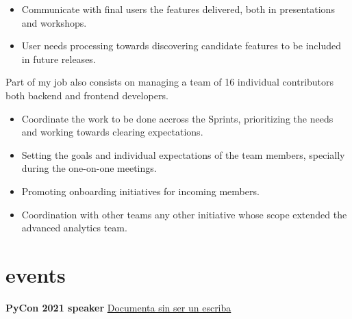 \documentclass[]{friggeri-cv}
\begin{document}
\begin{entrylist}
{\begin{itemize}
  \item Communicate with final users the features delivered, both in presentations and workshops.
  \item User needs processing towards discovering candidate features to be included in future releases.
\end{itemize}
Part of my job also consists on managing a team of 16 individual contributors both backend and frontend developers.
\begin{itemize}
  \item Coordinate the work to be done accross the Sprints, prioritizing the needs and working towards clearing expectations.
  \item Setting the goals and individual expectations of the team members, specially during the one-on-one meetings.
  \item Promoting onboarding initiatives for incoming members.
  \item Coordination with other teams any other initiative whose scope extended the advanced analytics team.
\end{itemize}}
\end{entrylist}


\section{events}

\textbf{\headingfont PyCon 2021 speaker} \href{https://www.youtube.com/watch?v=U8SP_Osd8ZY}{Documenta sin ser un escriba}
 
\end{document}
